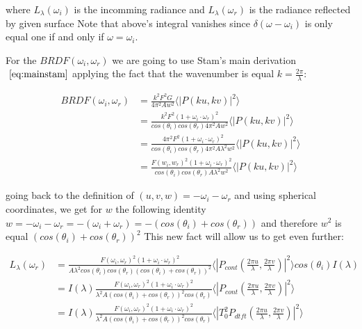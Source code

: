 where $L_{\lambda}(\omega_i)$ is the incomming radiance and $L_{\lambda}(\omega_r)$ is the radiance reflected by given surface
Note that above's integral vanishes since $\delta(\omega-\omega_i)$ is only equal one if and only if $\omega = \omega_i$.

For the $BRDF(\omega_i, \omega_r)$ we are going to use Stam's main derivation $~\eqref{eq:mainstam}$ applying the fact that the wavenumber is equal $k=\frac{2\pi}{\lambda}$:

\begin{align*}
BRDF(\omega_i, \omega_r) 
& = \frac{k^2 F^2 G}{4\pi^2 A w^2} \langle \left|P(ku, kv) \right|^2\rangle \\
& = \frac{k^2 F^2 (1 + \omega_i \cdot \omega_r)^2}{cos(\theta_i)cos(\theta_r) 4\pi^2 A w^2} \langle \left|P(ku, kv)  \right|^2\rangle \\
& = \frac{4 \pi^2 F^2 (1 + \omega_i \cdot \omega_r)^2}{cos(\theta_i)cos(\theta_r) 4\pi^2 A \lambda^2 w^2} \langle \left|P(ku, kv)  \right|^2\rangle \\
& = \frac{F(w_i, w_r)^2 (1 + \omega_i \cdot \omega_r)^2}{cos(\theta_i)cos(\theta_r) A \lambda^2 w^2} \langle \left|P(ku, kv)  \right|^2\rangle
\end{align*}

going back to the definition of $(u,v,w)= -\omega_i - \omega_r$ and using spherical coordinates, we get for $w$ the following identity $w = -\omega_i - \omega_r = -(\omega_i + \omega_r) = -(cos(\theta_i)+cos(\theta_r))$ and therefore $w^2$ is equal $(cos(\theta_i)+cos(\theta_r))^2$
This new fact will allow us to get even further:

\begin{align*}
L_{\lambda}(\omega_r) 
& = \frac{F(\omega_i, \omega_r)^2 (1 + \omega_i \cdot \omega_r)^2}{A \lambda^2 cos(\theta_i)cos(\theta_r)  (cos(\theta_i)+cos(\theta_r))^2} \langle \left|P_{cont}(\frac{2\pi u}{\lambda}, \frac{2\pi v}{\lambda})  \right|^2\rangle cos(\theta_i) I(\lambda) \\
& = I(\lambda) \frac{F(\omega_i, \omega_r)^2 (1 + \omega_i \cdot \omega_r)^2}{\lambda^2 A (cos(\theta_i)+cos(\theta_r))^2 cos(\theta_r)} \langle \left|P_{cont}(\frac{2\pi u}{\lambda}, \frac{2\pi v}{\lambda})  \right|^2\rangle \\
& = I(\lambda) \frac{F(\omega_i, \omega_r)^2 (1 + \omega_i \cdot \omega_r)^2}{\lambda^2 A (cos(\theta_i)+cos(\theta_r))^2 cos(\theta_r)} \langle \left|T_0^2 P_{dtft}(\frac{2\pi u}{\lambda}, \frac{2\pi v}{\lambda})  \right|^2\rangle
\end{align*}

